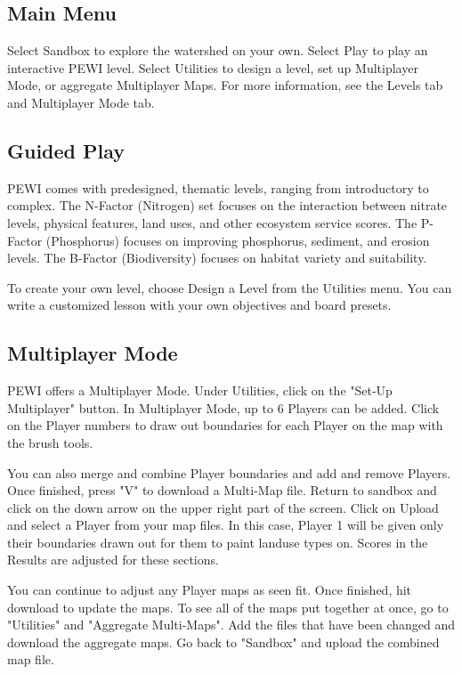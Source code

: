 \documentclass[11pt]{article}
\begin{document}
\begin{itemize}
\subsection{Main Menu}
Select Sandbox to explore the watershed on your own.
Select Play to play an interactive PEWI level.
Select Utilities to design a level, set up Multiplayer Mode, or aggregate Multiplayer Maps.
For more information, see the Levels tab and Multiplayer Mode tab.

\subsection{Guided Play}
PEWI comes with predesigned, thematic levels, ranging from introductory to complex. The N-Factor (Nitrogen) set focuses on the interaction between nitrate levels, physical features, land uses, and other ecosystem service scores. The P-Factor (Phosphorus) focuses on improving phosphorus, sediment, and erosion levels. The B-Factor (Biodiversity) focuses on habitat variety and suitability.

To create your own level, choose Design a Level from the Utilities menu. You can write a customized lesson with your own objectives and board presets.

\subsection{Multiplayer Mode}
PEWI offers a Multiplayer Mode. Under Utilities, click on the "Set-Up Multiplayer" button. In Multiplayer Mode, up to 6 Players can be added. Click on the Player numbers to draw out boundaries for each Player on the map with the brush tools.

You can also merge and combine Player boundaries and add and remove Players. Once finished, press "V" to download a Multi-Map file. Return to sandbox and click on the down arrow on the upper right part of the screen. Click on Upload and select a Player from your map files. In this case, Player 1 will be given only their boundaries drawn out for them to paint landuse types on. Scores in the Results are adjusted for these sections.

You can continue to adjust any Player maps as seen fit. Once finished, hit download to update the maps. To see all of the maps put together at once, go to "Utilities" and "Aggregate Multi-Maps". Add the files that have been changed and download the aggregate maps. Go back to "Sandbox" and upload the combined map file.


\end{itemize}
\end{document}
